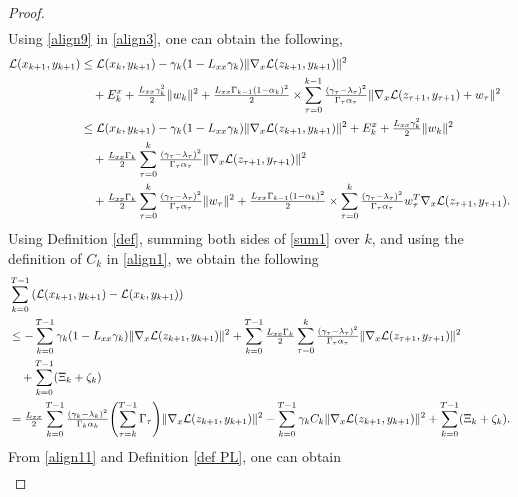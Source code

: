 \documentclass[letterpaper,11 pt]{article}
\def\ml{\mathcal L}
\newcommand{\mor}[1]{{\color{black}#1}}
\newcommand{\zal}[1]{{\color{black}#1}}
\newcommand{\af}[1]{{\color{black}#1}}
\newcommand{\mb}[1]{{\color{black}#1}}
\begin{document}
\begin{proof}
\begin{align}
\end{align}
Using \eqref{align9} in \eqref{align3}, one can obtain the following, 
\begin{align}\label{sum1}
\nonumber \ml{(x_{k+1},y_{k+1})}&\leq  \ml{(x_{k},y_{k+1})}-\gamma_k(1-L_{xx}\gamma_k)\|\nabla_x\ml{(z_{k+1},y_{k+1})}\|^2\\\nonumber&\quad+\af{E_k^x+\tfrac{L_{xx}\gamma_k^2}{2}\|w_k\|^2}+\tfrac{L_{xx}\Gamma_{\zal{k-1}}(1-\alpha_k)^2}{2}
\times \sum_{\tau=0}^\zal{k-1}\tfrac{(\gamma_\tau-\lambda_\tau)^2}{\Gamma_{\tau}\alpha_{\tau}}\|\nabla_x\ml{(z_{\tau+1},y_{\tau+1})}+w_\tau\|^2\\
\nonumber&\leq \ml{(x_{k},y_{k+1})}-\gamma_k(1-L_{xx}\gamma_k)\|\nabla_x\ml{(z_{k+1},y_{k+1})}\|^2+\af{E_k^x+\tfrac{L_{xx}\gamma_k^2}{2}\|w_k\|^2}\\\nonumber&\quad
+\tfrac{L_{xx}\Gamma_{k}}{ 2}\sum_{\tau=0}^{k}\tfrac{(\gamma_\tau-\lambda_\tau)^2}{\Gamma_{\tau}
\alpha_{\tau}}\|\nabla_x\ml{(z_{\tau+1},y_{\tau+1})}\|^2\\&\quad+\tfrac{L_{xx}\Gamma_{k}}{2}\sum_{\tau=0}^{k}\tfrac{(\gamma_\tau-\lambda_\tau)^2}{\Gamma_{\tau}\alpha_{\tau}}\|w_\tau\|^2+\tfrac{L_{xx}\Gamma_{\zal{k-1}}(1-\alpha_k)^2}{2}\times\af{\sum_{\tau=0}^{k}\tfrac{(\gamma_\tau-\lambda_\tau)^2}{\Gamma_{\tau}\alpha_{\tau}}}w_\tau^T\nabla_x\ml(z_{\tau+1},y_{\tau+1}).
\end{align}
Using Definition \ref{def}, summing both sides of \eqref{sum1} over $k$, and using the definition of $C_k$ in \eqref{align1}, we obtain the following
\begin{align}\label{align11}
\nonumber &\sum_{k=0}^{T-1}\left(\ml{(x_{k+1},y_{k+1})}-\ml{(x_{k},y_{k+1})}\right)\\ \nonumber&\leq-\sum_{k=0}^{T-1}\gamma_k(1-L_{xx}\gamma_k)\|\nabla_x \ml{(z_{k+1},y_{k+1})}\|^2+\sum_{k=0}^{T-1} \tfrac{L_{xx}\Gamma_\mor{{k}}}{2}\sum_{\tau=0}^\mor{{k}}\tfrac{(\gamma_\tau-\lambda_\tau)^2}{\Gamma_{\tau}\alpha_{\tau}}\|\nabla_x \ml{(z_{\zal{\tau+1}},y_{\zal{\tau+1}})}\|^2
\\ \nonumber&\quad+\mb{\sum_{k=0}^{T-1}(\Xi_k+\zeta_k)}\\
 &= \tfrac{L_{xx}}{ 2}\sum_{k=0}^{T-1}\tfrac{(\gamma_k-\lambda_k)^2}{\Gamma_{k}\alpha_{k}}\mor{\left(\sum_{\tau=k}^{T-1}\Gamma_\tau \right)} \|\nabla_x \ml{(z_{k+1},y_{k+1})}\|^2-\sum_{k=0}^{T-1}\gamma_k C_k\|\nabla_x \ml{(z_{k+1},y_{k+1})}\|^2+\mb{\sum_{k=0}^{T-1}(\Xi_k+\zeta_k)}.
\end{align}
From \eqref{align11} and Definition \eqref{def PL}, one can obtain
\begin{align*}

\end{align*}
\end{proof}
\end{document}
